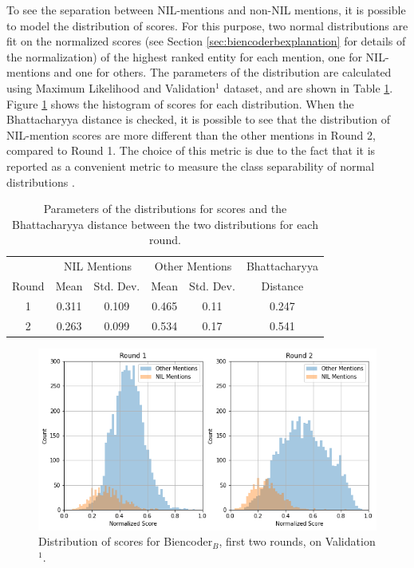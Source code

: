 \documentclass{report}
\theoremstyle{definition}
\theoremstyle{remark}
\begin{document}
To see the separation between NIL-mentions and non-NIL mentions, it is possible to model the distribution of scores. For this purpose, two normal distributions are fit on the normalized scores (see Section \ref{sec:biencoderbexplanation} for details of the normalization) of the highest ranked entity for each mention, one for NIL-mentions and one for others. The parameters of the distribution are calculated using Maximum Likelihood and Validation$^1$ dataset, and are shown in Table \ref{tab:nilnotnilBparams}. Figure \ref{fig:biencoderbnil} shows the histogram of scores for each distribution. When the Bhattacharyya distance  \cite{bhatt} is checked, it is possible to see that the distribution of NIL-mention scores are more different than the other mentions in Round 2, compared to Round 1. The choice of this metric is due to the fact that it is reported as a convenient metric to measure the class separability of normal distributions \cite{bhatt}.

\begin{table}[H]
    \centering
    \begin{tabular}{c|cc|cc|c}
    & \multicolumn{2}{c|}{NIL Mentions} & \multicolumn{2}{c|}{Other Mentions} & Bhattacharyya\\
     Round  &  Mean & Std. Dev. &  Mean &  Std. Dev.& Distance\\
     \hline
    1     &  0.311& 0.109&0.465&0.11&0.247\\ 
    2     & 0.263&0.099 & 0.534 & 0.17&0.541\\
    \end{tabular}
    \caption{Parameters of the distributions for scores and the Bhattacharyya distance between the two distributions for each round.}
    \label{tab:nilnotnilBparams}
\end{table}

\begin{figure}[H]
    \centering
    \includegraphics[scale=0.5]{biencoderbnil.png}
    \caption{Distribution of scores for Biencoder$_B$, first two rounds, on Validation$^1$.}
    \label{fig:biencoderbnil}
\end{figure}
\end{document}
